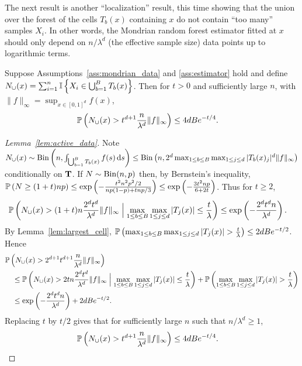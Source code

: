 The next result is another ``localization'' result, this time
showing that the union over the forest
of the cells $T_b(x)$ containing $x$ do not contain ``too many''
samples $X_i$.
In other words, the Mondrian random forest estimator fitted at $x$
should only depend on $n/\lambda^d$ (the effective sample size)
data points up to logarithmic terms.

\begin{lemma}%
  \label{lem:active_data}
  Suppose Assumptions~\ref{ass:mondrian_data} and \ref{ass:estimator} hold
  and define
  $N_{\cup}(x) =
  \sum_{i=1}^{n} \I \left\{ X_i \in \bigcup_{b=1}^{B} T_b(x) \right\}$.
  Then for $t > 0$ and sufficiently large $n$,
  with $\|f\|_\infty = \sup_{x \in [0,1]^d} f(x)$,
  \begin{align*}
    \P \left( N_{\cup}(x) > t^{d+1}
      \frac{n}{\lambda^d}
      \|f\|_\infty
    \right)
    &\leq
    4 d B e^{-t/4}.
  \end{align*}
\end{lemma}

\begin{proof}[Lemma~\ref{lem:active_data}]

  Note
  $N_\cup(x) \sim
  \Bin\left(n, \int_{\bigcup_{b=1}^{B} T_b(x)} f(s) \diff s \right)
  \leq \Bin\left(n, 2^d \max_{1 \leq b \leq B} \max_{1 \leq j \leq d}
  |T_b(x)_j|^d \|f\|_\infty \right)$
  conditionally on $\bT$.
  If $N \sim \Bin(n,p)$ then, by Bernstein's inequality,
  $\P\left( N \geq (1 + t) n p\right)
  \leq \exp\left(-\frac{t^2 n^2 p^2 / 2}{n p(1-p) + t n p / 3}\right)
  \leq \exp\left(-\frac{3t^2 n p}{6 + 2t}\right)$.
  Thus for $t \geq 2$,
  \begin{align*}
    \P \left( N_{\cup}(x) > (1+t) n \frac{2^d t^d}{\lambda^d}
      \|f\|_\infty
      \Bigm| \max_{1 \leq b \leq B} \max_{1 \leq j \leq d}
      |T_j(x)| \leq \frac{t}{\lambda}
    \right)
    &\leq
    \exp\left(- \frac{2^d t^{d} n}{\lambda^d}\right).
  \end{align*}
  By Lemma~\ref{lem:largest_cell},
  $\P \left( \max_{1 \leq b \leq B} \max_{1 \leq j \leq d}
  |T_j(x)| > \frac{t}{\lambda} \right)
  \leq 2 d B e^{-t/2}$.
  Hence
  \begin{align*}
    &\P \left( N_{\cup}(x) > 2^{d+1} t^{d+1} \frac{n}{\lambda^d}
      \|f\|_\infty
    \right) \\
    &\quad\leq
    \P \left( N_{\cup}(x) > 2 t n \frac{2^d t^d}{\lambda^d}
      \|f\|_\infty
      \Bigm| \max_{1 \leq b \leq B} \max_{1 \leq j \leq d}
      |T_j(x)| \leq \frac{t}{\lambda}
    \right)
    + \P \left( \max_{1 \leq b \leq B} \max_{1 \leq j \leq d}
      |T_j(x)| > \frac{t}{\lambda}
    \right) \\
    &\quad\leq
    \exp\left(- \frac{2^d t^{d} n}{\lambda^d}\right)
    + 2 d B e^{-t/2}.
  \end{align*}
  Replacing $t$ by $t/2$ gives that for sufficiently large $n$ such that
  $n / \lambda^d \geq 1$,
  \begin{align*}
    \P \left( N_{\cup}(x) > t^{d+1}
      \frac{n}{\lambda^d}
      \|f\|_\infty
    \right)
    &\leq
    4 d B e^{-t/4}.
  \end{align*}
\end{proof}

